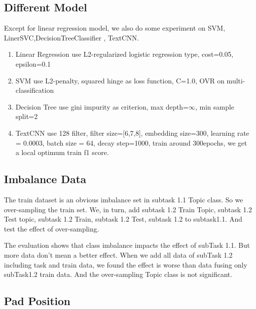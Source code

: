 

\subsection{Different Model}
\label{sec:different_model}

Except for linear regression model, we also do some experiment on SVM, LinerSVC,DecisionTreeClassifier , TextCNN.

\begin{enumerate}
    \item Linear Regression use L2-regularized logistic regression type, cost=0.05, epsilon=0.1
    \item SVM use L2-penalty, squared hinge as loss function, C=1.0, OVR on multi-classification
    \item Decision Tree use gini impurity as criterion, max depth=$\infty$, min sample split=2
    \item TextCNN use 128 filter, filter size=[6,7,8], embedding size=300, learning rate = 0.0003, batch size = 64, decay step=1000, train around 300epochs, we get a local optimum train f1 score.
\end{enumerate}



\subsection{Imbalance Data}
\label{sec:impalance_data}



The train dataset is an obvious imbalance set in subtask 1.1 Topic class. So we over-sampling the train set. We, in turn, add subtask 1.2 Train Topic, subtask 1.2 Test topic, subtask 1.2 Train, subtask 1.2 Test, subtask 1.2 to subtask1.1. And test the effect of over-sampling.

The evaluation shows that class imbalance impacts the effect of subTask 1.1. But more data don't mean a better effect. When we add all data of subTask 1.2 including task and train data, we found the effect is worse than data fusing only subTask1.2 train data. And the over-sampling Topic class is not significant.

\subsection{Pad Position}
\label{sec:pad_position}

